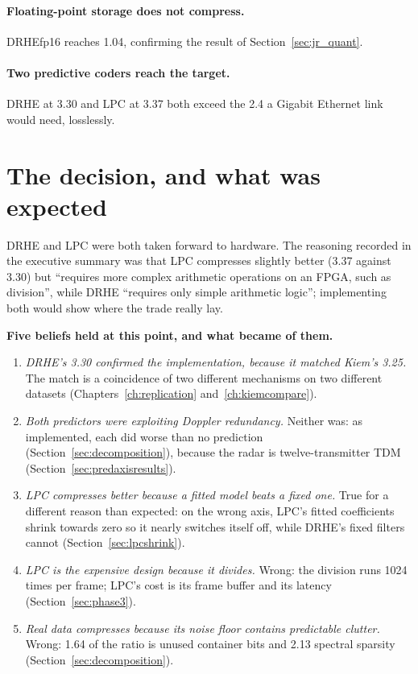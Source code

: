 \paragraph{Floating-point storage does not compress.} DRHEfp16 reaches 1.04,
confirming the result of Section~\ref{sec:jr_quant}.

\paragraph{Two predictive coders reach the target.} DRHE at 3.30 and LPC at
3.37 both exceed the 2.4 a Gigabit Ethernet link would need, losslessly.

\section{The decision, and what was expected}
\label{sec:jr_decision}

DRHE and LPC were both taken forward to hardware. The reasoning recorded in the
executive summary was that LPC compresses slightly better (3.37 against 3.30)
but ``requires more complex arithmetic operations on an FPGA, such as
division'', while DRHE ``requires only simple arithmetic logic''; implementing
both would show where the trade really lay.

\begin{keybox}
\textbf{Five beliefs held at this point, and what became of them.}
\begin{enumerate}[leftmargin=*]
\item \emph{DRHE's 3.30 confirmed the implementation, because it matched
Kiem's 3.25.} The match is a coincidence of two different mechanisms on two
different datasets (Chapters~\ref{ch:replication} and~\ref{ch:kiemcompare}).
\item \emph{Both predictors were exploiting Doppler redundancy.} Neither was:
as implemented, each did worse than no prediction (Section~\ref{sec:decomposition}),
because the radar is twelve-transmitter TDM (Section~\ref{sec:predaxisresults}).
\item \emph{LPC compresses better because a fitted model beats a fixed one.}
True for a different reason than expected: on the wrong axis, LPC's fitted
coefficients shrink towards zero so it nearly switches itself off, while DRHE's
fixed filters cannot (Section~\ref{sec:lpcshrink}).
\item \emph{LPC is the expensive design because it divides.} Wrong: the
division runs 1024 times per frame; LPC's cost is its frame buffer and its
latency (Section~\ref{sec:phase3}).
\item \emph{Real data compresses because its noise floor contains predictable
clutter.} Wrong: \num{1.64} of the ratio is unused container bits and
\num{2.13} spectral sparsity (Section~\ref{sec:decomposition}).
\end{enumerate}
\end{keybox}
